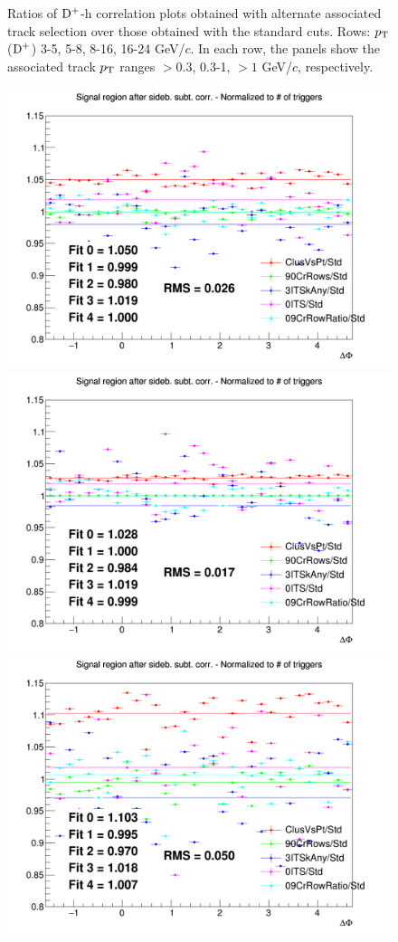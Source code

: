 \begin{figure}
 \caption{Ratios of ${\rm D^+}$-h correlation plots obtained with alternate associated track selection over those obtained with the standard cuts. Rows: $p_{\rm T}$(${\rm D^+}$) 3-5, 5-8, 8-16, 16-24 GeV/$c$. In each row, the panels show the associated track
$p_{\rm T}$ ranges $> 0.3$, 0.3-1, $> 1$ GeV/$c$, respectively.}
\label{fig:SysTrEff60100_Dplus}
\end{figure}

\begin{figure}
\centering
{\includegraphics[width=0.31\linewidth]{figuresVsCent/Dstar/SystTrackEff/AssTrackSyst_60100/Ratio_AzimCorrDistr_Dstar_Canvas_PtIntBins2to3_PoolInt_thr03to99_ASS_60100.png}}
{\includegraphics[width=0.31\linewidth]{figuresVsCent/Dstar/SystTrackEff/AssTrackSyst_60100/Ratio_AzimCorrDistr_Dstar_Canvas_PtIntBins2to3_PoolInt_thr03to1_ASS_60100.png}}
{\includegraphics[width=0.31\linewidth]{figuresVsCent/Dstar/SystTrackEff/AssTrackSyst_60100/Ratio_AzimCorrDistr_Dstar_Canvas_PtIntBins2to3_PoolInt_thr1to99_ASS_60100.png}} \\


\end{figure}
